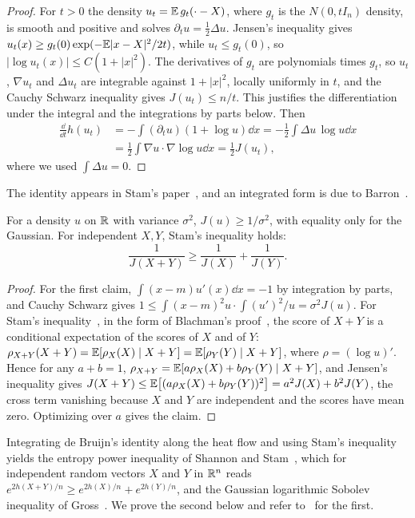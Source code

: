 \begin{proof}
For $t>0$ the density $u_t = \mathbb{E}\,g_t(\cdot-X)$, where $g_t$ is the $N(0,tI_n)$ density, is smooth and positive and solves $\partial_tu = \frac12\Delta u$. Jensen's inequality gives $u_t(x)\geq g_t(0)\exp(-\mathbb{E}|x-X|^2/2t)$, while $u_t\leq g_t(0)$, so $|\log u_t(x)|\leq C(1+|x|^2)$. The derivatives of $g_t$ are polynomials times $g_t$, so $u_t$, $\nabla u_t$ and $\Delta u_t$ are integrable against $1+|x|^2$, locally uniformly in $t$, and the Cauchy Schwarz inequality gives $J(u_t)\leq n/t$. This justifies the differentiation under the integral and the integrations by parts below. Then
\[
\begin{aligned}\frac{\dd}{\dd t}h(u_t) &= -\int(\partial_tu)(1+\log u)\dd x = -\frac12\int\Delta u\,\log u\dd x\\ &= \frac12\int\nabla u\cdot\nabla\log u\dd x = \frac12J(u_t),\end{aligned}
\]
where we used $\int\Delta u = 0$.
\end{proof}

The identity appears in Stam's paper~\cite{stam1959}, and an integrated form is due to Barron~\cite{barron1986}.

\begin{theorem}
\label{thm:stam}
For a density $u$ on $\mathbb{R}$ with variance $\sigma^2$, $J(u)\geq1/\sigma^2$, with equality only for the Gaussian. For independent $X,Y$, Stam's inequality holds:
\[
\frac{1}{J(X+Y)}\geq\frac{1}{J(X)}+\frac{1}{J(Y)}.
\]
\end{theorem}

\begin{proof}
For the first claim, $\int(x-m)u'(x)\dd x = -1$ by integration by parts, and Cauchy Schwarz gives $1\leq\int(x-m)^2u\cdot\int(u')^2/u = \sigma^2J(u)$. For Stam's inequality~\cite{stam1959}, in the form of Blachman's proof~\cite{blachman1965}, the score of $X+Y$ is a conditional expectation of the scores of $X$ and of $Y$: $\rho_{X+Y}(X+Y) = \mathbb{E}[\rho_X(X)\mid X+Y] = \mathbb{E}[\rho_Y(Y)\mid X+Y]$, where $\rho = (\log u)'$. Hence for any $a+b=1$, $\rho_{X+Y} = \mathbb{E}[a\rho_X(X)+b\rho_Y(Y)\mid X+Y]$, and Jensen's inequality gives $J(X+Y)\leq\mathbb{E}\big[(a\rho_X(X)+b\rho_Y(Y))^2\big] = a^2J(X)+b^2J(Y)$, the cross term vanishing because $X$ and $Y$ are independent and the scores have mean zero. Optimizing over $a$ gives the claim.
\end{proof}

Integrating de Bruijn's identity along the heat flow and using Stam's inequality yields the entropy power inequality of Shannon and Stam~\cite{shannon1948,stam1959,blachman1965}, which for independent random vectors $X$ and $Y$ in $\mathbb{R}^n$ reads $e^{2h(X+Y)/n}\geq e^{2h(X)/n}+e^{2h(Y)/n}$, and the Gaussian logarithmic Sobolev inequality of Gross~\cite{gross1975}. We prove the second below and refer to~\cite{covertomas} for the first.

